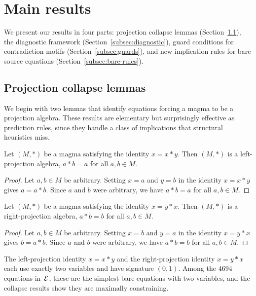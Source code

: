 \section{Main results}\label{sec:main}

We present our results in four parts: projection collapse lemmas
(Section~\ref{subsec:collapse}), the diagnostic framework
(Section~\ref{subsec:diagnostic}), guard conditions for
contradiction motifs (Section~\ref{subsec:guards}), and new
implication rules for bare source equations
(Section~\ref{subsec:bare-rules}).

\subsection{Projection collapse lemmas}\label{subsec:collapse}

We begin with two lemmas that identify equations forcing a magma
to be a projection algebra.  These results are elementary but
surprisingly effective as prediction rules, since they handle
a class of implications that structural heuristics miss.

\begin{theorem}\label{thm:left-proj}
Let $(M, *)$ be a magma satisfying the identity $x = x * y$.  Then
$(M, *)$ is a left-projection algebra, \ie $a * b = a$ for all
$a, b \in M$.
\end{theorem}

\begin{proof}
Let $a, b \in M$ be arbitrary.  Setting $x = a$ and $y = b$ in the
identity $x = x * y$ gives $a = a * b$.  Since $a$ and $b$ were
arbitrary, we have $a * b = a$ for all $a, b \in M$.
\end{proof}

\begin{theorem}\label{thm:right-proj}
Let $(M, *)$ be a magma satisfying the identity $x = y * x$.  Then
$(M, *)$ is a right-projection algebra, \ie $a * b = b$ for all
$a, b \in M$.
\end{theorem}

\begin{proof}
Let $a, b \in M$ be arbitrary.  Setting $x = b$ and $y = a$ in the
identity $x = y * x$ gives $b = a * b$.  Since $a$ and $b$ were
arbitrary, we have $a * b = b$ for all $a, b \in M$.
\end{proof}

\begin{remark}\label{rem:proj-unique}
The left-projection identity $x = x * y$ and the right-projection
identity $x = y * x$ each use exactly two variables and have
signature $(0, 1)$.  Among the $4694$ equations in~$\mathcal{E}$, these
are the simplest bare equations with two variables, and the collapse
results show they are maximally constraining.
\end{remark}


